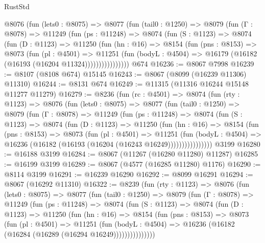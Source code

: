 \begin{lexlean}{RustStd}
\begin{coremodule}
        @8076
          (fun (lets0 : @8075) =>
          @8077
            (fun (tail0 : @1250) =>
            @8079
              (fun (Γ : @8078) =>
              @11249
                (fun (ps : @11248) =>
                @8074
                  (fun (S : @1123) =>
                  @8074
                    (fun (D : @1123) =>
                    @11250
                      (fun (hn : @16) =>
                      @8154
                        (fun (pns : @8153) =>
                        @8073
                          (fun (pl : @4501) =>
                          @11251
                            (fun (bodyL : @4504) =>
                            @16179 (@16182 (@16193 (@16204 @11324))))))))))))))))
    @674
@16236 := @8067 @7998
@16239 := @8107 (@8108 @674) @15145
@16243 := @8067 (@8099 (@16239 @11306) @11310)
@16244 := @8131 @674
@16249 := @11315 (@11316 @16244 @15148 @11277 @11279)
@16279 := @8236
    (fun (rc : @4501) =>
    @8074
      (fun (rty : @1123) =>
      @8076
        (fun (lets0 : @8075) =>
        @8077
          (fun (tail0 : @1250) =>
          @8079
            (fun (Γ : @8078) =>
            @11249
              (fun (ps : @11248) =>
              @8074
                (fun (S : @1123) =>
                @8074
                  (fun (D : @1123) =>
                  @11250
                    (fun (hn : @16) =>
                    @8154
                      (fun (pns : @8153) =>
                      @8073
                        (fun (pl : @4501) =>
                        @11251
                          (fun (bodyL : @4504) =>
                          @16236 (@16182 (@16193 (@16204 (@16243 @16249))))))))))))))))
    @3199
@16280 := @16188 @3199
@16284 := @8067 (@11267 (@16280 @11280) @11287)
@16285 := @16199 @3199
@16289 := @8067 (@4577 (@16285 @11280) @1176)
@16290 := @8114 @3199
@16291 := @16239 @16290
@16292 := @8099 @16291
@16294 := @8067 (@16292 @11310)
@16322 := @8239
    (fun (rty : @1123) =>
    @8076
      (fun (lets0 : @8075) =>
      @8077
        (fun (tail0 : @1250) =>
        @8079
          (fun (Γ : @8078) =>
          @11249
            (fun (ps : @11248) =>
            @8074
              (fun (S : @1123) =>
              @8074
                (fun (D : @1123) =>
                @11250
                  (fun (hn : @16) =>
                  @8154
                    (fun (pns : @8153) =>
                    @8073
                      (fun (pl : @4501) =>
                      @11251
                        (fun (bodyL : @4504) =>
                        @16236 (@16182 (@16284 (@16289 (@16294 @16249)))))))))))))))

\end{coremodule}
\end{lexlean}
